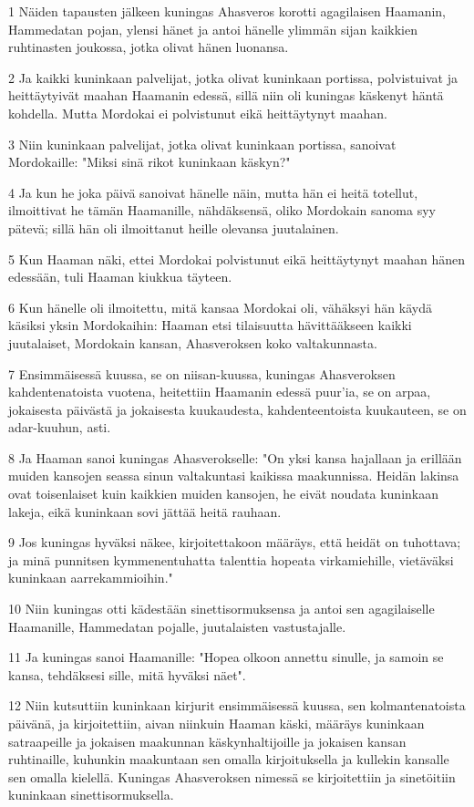 \par 1 Näiden tapausten jälkeen kuningas Ahasveros korotti agagilaisen Haamanin, Hammedatan pojan, ylensi hänet ja antoi hänelle ylimmän sijan kaikkien ruhtinasten joukossa, jotka olivat hänen luonansa.
\par 2 Ja kaikki kuninkaan palvelijat, jotka olivat kuninkaan portissa, polvistuivat ja heittäytyivät maahan Haamanin edessä, sillä niin oli kuningas käskenyt häntä kohdella. Mutta Mordokai ei polvistunut eikä heittäytynyt maahan.
\par 3 Niin kuninkaan palvelijat, jotka olivat kuninkaan portissa, sanoivat Mordokaille: "Miksi sinä rikot kuninkaan käskyn?"
\par 4 Ja kun he joka päivä sanoivat hänelle näin, mutta hän ei heitä totellut, ilmoittivat he tämän Haamanille, nähdäksensä, oliko Mordokain sanoma syy pätevä; sillä hän oli ilmoittanut heille olevansa juutalainen.
\par 5 Kun Haaman näki, ettei Mordokai polvistunut eikä heittäytynyt maahan hänen edessään, tuli Haaman kiukkua täyteen.
\par 6 Kun hänelle oli ilmoitettu, mitä kansaa Mordokai oli, vähäksyi hän käydä käsiksi yksin Mordokaihin: Haaman etsi tilaisuutta hävittääkseen kaikki juutalaiset, Mordokain kansan, Ahasveroksen koko valtakunnasta.
\par 7 Ensimmäisessä kuussa, se on niisan-kuussa, kuningas Ahasveroksen kahdentenatoista vuotena, heitettiin Haamanin edessä puur'ia, se on arpaa, jokaisesta päivästä ja jokaisesta kuukaudesta, kahdenteentoista kuukauteen, se on adar-kuuhun, asti.
\par 8 Ja Haaman sanoi kuningas Ahasverokselle: "On yksi kansa hajallaan ja erillään muiden kansojen seassa sinun valtakuntasi kaikissa maakunnissa. Heidän lakinsa ovat toisenlaiset kuin kaikkien muiden kansojen, he eivät noudata kuninkaan lakeja, eikä kuninkaan sovi jättää heitä rauhaan.
\par 9 Jos kuningas hyväksi näkee, kirjoitettakoon määräys, että heidät on tuhottava; ja minä punnitsen kymmenentuhatta talenttia hopeata virkamiehille, vietäväksi kuninkaan aarrekammioihin."
\par 10 Niin kuningas otti kädestään sinettisormuksensa ja antoi sen agagilaiselle Haamanille, Hammedatan pojalle, juutalaisten vastustajalle.
\par 11 Ja kuningas sanoi Haamanille: "Hopea olkoon annettu sinulle, ja samoin se kansa, tehdäksesi sille, mitä hyväksi näet".
\par 12 Niin kutsuttiin kuninkaan kirjurit ensimmäisessä kuussa, sen kolmantenatoista päivänä, ja kirjoitettiin, aivan niinkuin Haaman käski, määräys kuninkaan satraapeille ja jokaisen maakunnan käskynhaltijoille ja jokaisen kansan ruhtinaille, kuhunkin maakuntaan sen omalla kirjoituksella ja kullekin kansalle sen omalla kielellä. Kuningas Ahasveroksen nimessä se kirjoitettiin ja sinetöitiin kuninkaan sinettisormuksella.
